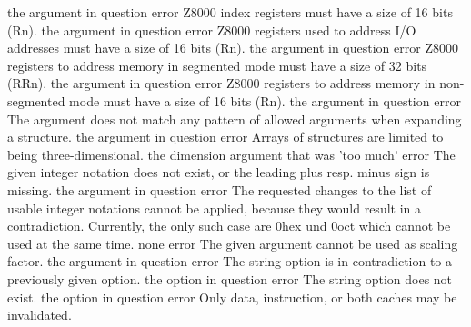 \documentclass[12pt,twoside]{report}
\begin{document}
\begin{description}
               {the argument in question}
               {error}
               {Z8000 index registers must have a size of 16 bits (Rn).}
               {the argument in question}
               {error}
               {Z8000 registers used to address I/O addresses must have a size of 16 bits (Rn).}
               {the argument in question}
               {error}
               {Z8000 registers to address memory in segmented mode must have a size of 32 bits (RRn).}
               {the argument in question}
               {error}
               {Z8000 registers to address memory in non-segmented mode must have a size of 16 bits (Rn).}
               {the argument in question}
               {error}
               {The argument does not match any pattern of allowed arguments
                when expanding a structure.}
               {the argument in question}
               {error}
               {Arrays of structures are limited to being three-dimensional.}
               {the dimension argument that was 'too much'}
               {error}
               {The given integer notation does not exist, or the leading plus resp.
                minus sign is missing.}
               {the argument in question}
               {error}
               {The requested changes to the list of usable integer notations cannot
                be applied, because they would result in a contradiction.  Currently,
                the only such case are 0hex und 0oct which cannot be used at the same
                time.}
               {none}
               {error}
               {The given argument cannot be used as scaling factor.}
               {the argument in question}
               {error}
               {The string option is in contradiction to a previously given option.}
               {the option in question}
               {error}
               {The string option does not exist.}
               {the option in question}
               {error}
               {Only data, instruction, or both caches may be invalidated.}

\end{description}
\end{document}

